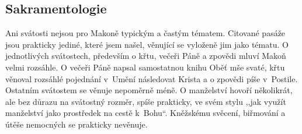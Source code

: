 \subsection{Sakramentologie}

Ani svátosti nejsou pro Makoně typickým a častým tématem. Citované pasáže jsou
prakticky jediné, které jsem našel, věnující se vyloženě jim jako tématu. O
jednotlivých svátostech, především o křtu, večeři Páně a zpovědi mluví Makoň velmi
rozsáhle. O večeři Páně napsal samostatnou knihu Oběť mše svaté\cite{KaMaMse}, křtu věnoval
rozsáhlé pojednání v~Umění následovat Krista\cite{KaMaUNK} a o zpovědi píše
v~Postile\cite{KaMaPost}. Ostatním svátostem
se věnuje nepoměrně méně. O manželství hovoří několikrát, ale bez důrazu na
svátostný rozměr, spíše prakticky, ve svém stylu ,,jak využít manželství jako
prostředek na cestě k~Bohu``. Kněžskému svěcení, biřmování a útěše nemocných se
prakticky nevěnuje.

